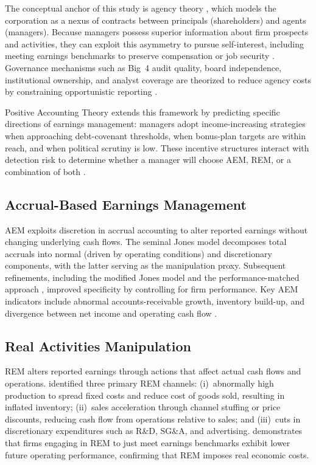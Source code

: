 \documentclass[12pt]{article}
\begin{document}
The conceptual anchor of this study is agency theory
\citep{jensen1976,eisenhardt1989}, which models the corporation as a nexus of
contracts between principals (shareholders) and agents (managers).  Because
managers possess superior information about firm prospects and activities, they
can exploit this asymmetry to pursue self-interest, including meeting earnings
benchmarks to preserve compensation or job security
\citep{graham2005,healy1999}.  Governance mechanisms such as Big~4 audit
quality, board independence, institutional ownership, and analyst coverage are
theorized to reduce agency costs by constraining opportunistic reporting
\citep{shleifer1997,watts1986}.

Positive Accounting Theory \citep{watts1986} extends this framework by
predicting specific directions of earnings management: managers adopt
income-increasing strategies when approaching debt-covenant thresholds, when
bonus-plan targets are within reach, and when political scrutiny is low.  These
incentive structures interact with detection risk to determine whether a manager
will choose AEM, REM, or a combination of both \citep{graham2005}.

\subsection*{Accrual-Based Earnings Management}

AEM exploits discretion in accrual accounting to alter reported earnings
without changing underlying cash flows.  The seminal Jones \citeyearpar{jones1991}
model decomposes total accruals into normal (driven by operating conditions) and
discretionary components, with the latter serving as the manipulation proxy.
Subsequent refinements, including the modified Jones model \citep{dechow1995}
and the performance-matched approach \citep{kothari2005}, improved specificity by
controlling for firm performance.  Key AEM indicators include abnormal
accounts-receivable growth, inventory build-up, and divergence between net
income and operating cash flow \citep{richardson2005}.

\subsection*{Real Activities Manipulation}

REM alters reported earnings through actions that affect actual cash flows and
operations.  \citet{roychowdhury2006} identified three primary REM channels:
(i)~abnormally high production to spread fixed costs and reduce cost of goods
sold, resulting in inflated inventory; (ii)~sales acceleration through channel
stuffing or price discounts, reducing cash flow from operations relative to
sales; and (iii)~cuts in discretionary expenditures such as R\&D, SG\&A, and
advertising.  \citet{gunny2010} demonstrates that firms engaging in REM to
just meet earnings benchmarks exhibit lower future operating performance,
confirming that REM imposes real economic costs.
\end{document}
